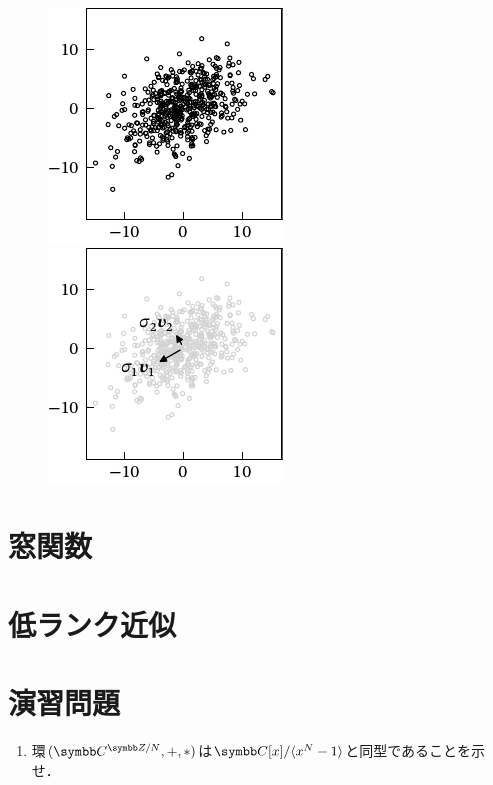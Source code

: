 \documentclass[../../main]{subfiles}
\begin{document}
\begin{figure}[htbp]
  \begin{minipage}{\linewidth/2}
    \centering
    \includegraphics{figures/scatter.pdf}
  \end{minipage}%
  \begin{minipage}{\linewidth/2}
    \centering
    \includegraphics{figures/pca.pdf}
  \end{minipage}
\end{figure}

\begin{subappendices}
\section{窓関数}

\section{低ランク近似}

\end{subappendices}

\section*{演習問題}

\begin{enumerate}
  \item 環\((\cycles{\numset{C}}{N},+,\circconv)\)は\(\numset{C}[x]/\langle x^N-1\rangle\)と同型であることを示せ．
\end{enumerate}
\end{document}
